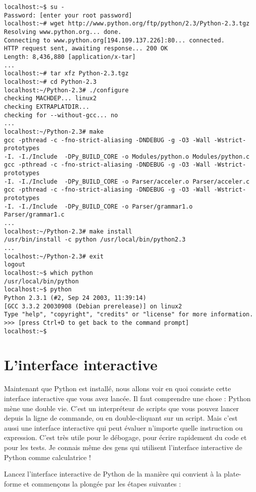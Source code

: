 \begin{lstlisting}[style=none]
localhost:~$ su -
Password: [enter your root password]
localhost:~# wget http://www.python.org/ftp/python/2.3/Python-2.3.tgz
Resolving www.python.org... done.
Connecting to www.python.org[194.109.137.226]:80... connected.
HTTP request sent, awaiting response... 200 OK
Length: 8,436,880 [application/x-tar]
...
localhost:~# tar xfz Python-2.3.tgz
localhost:~# cd Python-2.3
localhost:~/Python-2.3# ./configure
checking MACHDEP... linux2
checking EXTRAPLATDIR...
checking for --without-gcc... no
...
localhost:~/Python-2.3# make
gcc -pthread -c -fno-strict-aliasing -DNDEBUG -g -O3 -Wall -Wstrict-prototypes
-I. -I./Include  -DPy_BUILD_CORE -o Modules/python.o Modules/python.c
gcc -pthread -c -fno-strict-aliasing -DNDEBUG -g -O3 -Wall -Wstrict-prototypes
-I. -I./Include  -DPy_BUILD_CORE -o Parser/acceler.o Parser/acceler.c
gcc -pthread -c -fno-strict-aliasing -DNDEBUG -g -O3 -Wall -Wstrict-prototypes
-I. -I./Include  -DPy_BUILD_CORE -o Parser/grammar1.o Parser/grammar1.c
...
localhost:~/Python-2.3# make install
/usr/bin/install -c python /usr/local/bin/python2.3
...
localhost:~/Python-2.3# exit
logout
localhost:~$ which python
/usr/local/bin/python
localhost:~$ python
Python 2.3.1 (#2, Sep 24 2003, 11:39:14)
[GCC 3.3.2 20030908 (Debian prerelease)] on linux2
Type "help", "copyright", "credits" or "license" for more information.
>>> [press Ctrl+D to get back to the command prompt]
localhost:~$
\end{lstlisting}

\section{L'interface interactive}\label{L'interface interactive}

Maintenant que Python est installé, nous allons voir en quoi consiste cette interface interactive que vous avez lancée.
Il faut comprendre une chose : Python mène une double vie. C'est un interpréteur de scripts que vous pouvez lancer depuis la ligne de commande, ou en double-cliquant sur un script. Mais c'est aussi une interface interactive qui peut évaluer n'importe quelle instruction ou expression. C'est très utile pour le débogage, pour écrire rapidement du code et pour les tests. Je connais même des gens qui utilisent l'interface interactive de Python comme calculatrice !

Lancez l'interface interactive de Python de la manière qui convient à la plate-forme et commençons la plongée par les étapes suivantes :


